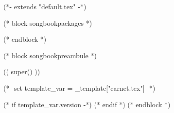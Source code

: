 (*- extends "default.tex" -*)

(* block songbookpackages *)
\usepackage[
    (* for option in _bookoptions *)((option)),
    (* endfor *)
    ]{crepbook}
(* endblock *)

(* block songbookpreambule *)
\usepackage[
     a5paper %
     ,landscape
     ,includeheadfoot %
     ,hmarginratio=1:1 %
     ,outer=1.2cm %
     ,vmarginratio=1:1 %
     ,bmargin=0.3cm %
     ]{geometry}

(( super() ))


\usepackage{fontspec}

\setmainfont{Noto Serif}
\setmonofont{Liberation Mono}
\def\@chordfont{Liberation Mono}

\pagestyle{empty}

(*- set template_var = _template["carnet.tex"] -*)


\renewcommand{\snumbgcolor}{SongNumberBgColor}
\renewcommand{\notebgcolor}{NoteBgColor}
\renewcommand{\idxbgcolor}{IndexBgColor}

\usepackage[
    bookmarks,
    bookmarksopen,
    hyperfigures=true,
    colorlinks=true,
    linkcolor=tango-green-3,
    urlcolor=tango-blue-3,
    unicode=true,
    ]{hyperref}
\usepackage{datetime}
\usepackage{emoji}

\date{}
\subtitle{
  Mariage de Yannick et Johan 
}


(* if template_var.version -*)
(* endif *)
(* endblock *)